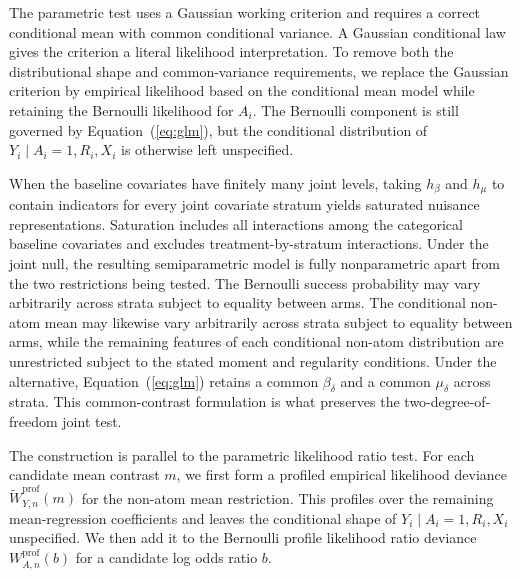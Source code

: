 \documentclass[11pt]{article}
\begin{document}
The parametric test uses a Gaussian working criterion and requires a correct conditional mean with common conditional variance. A Gaussian conditional law gives the criterion a literal likelihood interpretation. To remove both the distributional shape and common-variance requirements, we replace the Gaussian criterion by empirical likelihood based on the conditional mean model while retaining the Bernoulli likelihood for $A_i$. The Bernoulli component is still governed by Equation~(\ref{eq:glm}), but the conditional distribution of $Y_i\mid A_i=1,R_i,X_i$ is otherwise left unspecified.

When the baseline covariates have finitely many joint levels, taking $h_\beta$ and $h_\mu$ to contain indicators for every joint covariate stratum yields saturated nuisance representations. Saturation includes all interactions among the categorical baseline covariates and excludes treatment-by-stratum interactions. Under the joint null, the resulting semiparametric model is fully nonparametric apart from the two restrictions being tested. The Bernoulli success probability may vary arbitrarily across strata subject to equality between arms. The conditional non-atom mean may likewise vary arbitrarily across strata subject to equality between arms, while the remaining features of each conditional non-atom distribution are unrestricted subject to the stated moment and regularity conditions. Under the alternative, Equation~(\ref{eq:glm}) retains a common $\beta_\delta$ and a common $\mu_\delta$ across strata. This common-contrast formulation is what preserves the two-degree-of-freedom joint test.

The construction is parallel to the parametric likelihood ratio test. For each candidate mean contrast $m$, we first form a profiled empirical likelihood deviance $\widetilde{W}_{Y,n}^{\mathrm{prof}}(m)$ for the non-atom mean restriction. This profiles over the remaining mean-regression coefficients and leaves the conditional shape of $Y_i\mid A_i=1,R_i,X_i$ unspecified. We then add it to the Bernoulli profile likelihood ratio deviance $W_{A,n}^{\mathrm{prof}}(b)$ for a candidate log odds ratio $b$.
\end{document}
